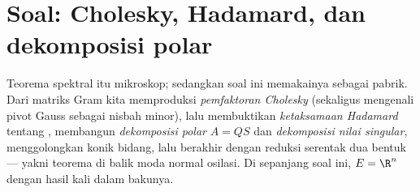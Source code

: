 \section{Soal: Cholesky, Hadamard, dan dekomposisi
polar}

\begin{problem}\label{pb:b2:quadratic:1}
Teorema spektral itu mikroskop; sedangkan soal ini memakainya sebagai
pabrik. Dari matriks Gram kita memproduksi \emph{pemfaktoran
Cholesky} (sekaligus mengenali
pivot Gauss sebagai nisbah minor), lalu membuktikan \emph{ketaksamaan
Hadamard} tentang , membangun
\emph{dekomposisi polar} $A =
QS$ dan \emph{dekomposisi nilai singular}, menggolongkan
konik bidang, lalu berakhir dengan reduksi serentak dua bentuk ---
yakni teorema di balik moda normal osilasi. Di sepanjang soal ini, $E =
\R^n$ dengan hasil kali dalam bakunya.


\end{problem}
